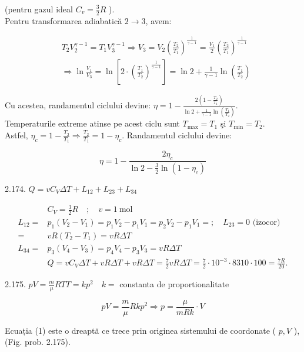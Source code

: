 (pentru gazul ideal $C_{v}=\frac{3}{2} R$ ).\\
Pentru transformarea adiabatică $2 \rightarrow 3$, avem:

$$
\begin{aligned}
& T_{2} V_{2}^{\gamma-1}=T_{1} V_{3}^{\gamma-1} \Rightarrow V_{3}=V_{2}\left(\frac{T_{2}}{T_{1}}\right)^{\frac{1}{\gamma-1}}=\frac{V_{1}}{2}\left(\frac{T_{2}}{T_{1}}\right)^{\frac{1}{\gamma-1}} \\
& \Rightarrow \ln \frac{V_{1}}{V_{3}}=\ln \left[2 \cdot\left(\frac{T_{1}}{T_{2}}\right)^{\frac{1}{\gamma-1}}\right]=\ln 2+\frac{1}{\gamma-1} \ln \left(\frac{T_{1}}{T_{2}}\right)
\end{aligned}
$$

Cu acestea, randamentul ciclului devine: $\eta=1-\frac{2\left(1-\frac{T_{2}}{T_{1}}\right)}{\ln 2+\frac{1}{\gamma-1} \ln \left(\frac{T_{1}}{T_{2}}\right)}$.\\
Temperaturile extreme atinse pe acest ciclu sunt $T_{\max }=T_{1}$ şi $T_{\min }=T_{2}$.\\
Astfel, $\eta_{c}=1-\frac{T_{2}}{T_{1}} \Rightarrow \frac{T_{2}}{T_{1}}=1-\eta_{c}$. Randamentul ciclului devine:

$$
\eta=1-\frac{2 \eta_{c}}{\ln 2-\frac{3}{2} \ln \left(1-\eta_{c}\right)}
$$

2.174. $Q=v C_{V} \Delta T+L_{12}+L_{23}+L_{34}$

$$
\begin{aligned}
& C_{V}=\frac{3}{2} R \quad ; \quad v=1 \mathrm{~mol} \\
L_{12}= & p_{1}\left(V_{2}-V_{1}\right)=p_{1} V_{2}-p_{1} V_{1}=p_{2} V_{2}-p_{1} V_{1}=; \quad L_{23}=0 \text { (izocor) } \\
= & v R\left(T_{2}-T_{1}\right)=v R \Delta T \\
L_{34}= & p_{3}\left(V_{4}-V_{3}\right)=p_{4} V_{4}-p_{3} V_{3}=v R \Delta T \\
& Q=v C_{V} \Delta T+v R \Delta T+v R \Delta T=\frac{7}{2} v R \Delta T=\frac{7}{2} \cdot 10^{-3} \cdot 8310 \cdot 100=\frac{7 R}{20} .
\end{aligned}
$$

2.175. $p V=\frac{m}{\mu} R T T=k p^{2} \quad k=$ constanta de proportionalitate


\begin{equation*}
p V=\frac{m}{\mu} R k p^{2} \Rightarrow p=\frac{\mu}{m R k} \cdot V \tag{1}
\end{equation*}


Ecuația (1) este o dreaptă ce trece prin originea sistemului de coordonate ( $p, V$ ), (Fig. prob. 2.175).

